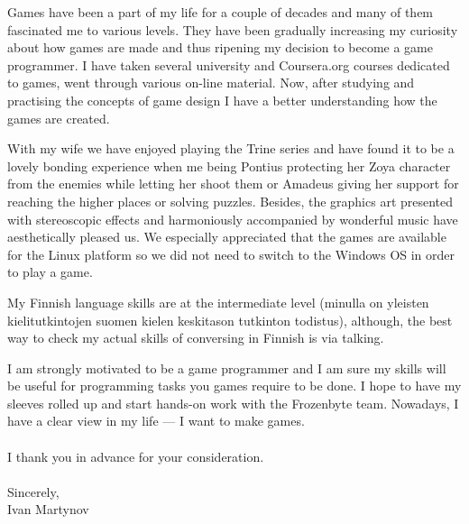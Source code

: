 \documentclass[]{article}
\begin{document}
Games have been a part of my life for a couple of decades and many of them
fascinated me to various levels. They have been gradually increasing my
curiosity about how games are made and thus ripening my decision to become a
game programmer. I have taken several university and Coursera.org courses
dedicated to games, went through various on-line material. Now, after studying
and practising the concepts of game design I have a better understanding how
the games are created.

With my wife we have enjoyed playing the Trine series and have found it to be a
lovely bonding experience when me being Pontius protecting her Zoya character
from the enemies while letting her shoot them or Amadeus giving her support for
reaching the higher places or solving puzzles. Besides, the graphics art
presented with stereoscopic effects and harmoniously accompanied by wonderful
music have aesthetically pleased us. We especially appreciated that the games
are available for the Linux platform so we did not need to switch to the Windows
OS in order to play a game.

My Finnish language skills are at the intermediate level (minulla on yleisten
kielitutkintojen suomen kielen keskitason tutkinton todistus), although, the
best way to check my actual skills of conversing in Finnish is via talking.


I am strongly motivated to be a game programmer and I am sure my skills will be
useful for programming tasks you games require to be done. I hope to have my
sleeves rolled up and start hands-on work with the Frozenbyte team.
Nowadays, I have a clear view in my life --- I want to make games.
\\\ \\

\noindent
I thank you in advance for your consideration.\\\ \\

\noindent Sincerely,\\
Ivan Martynov
\end{document}

